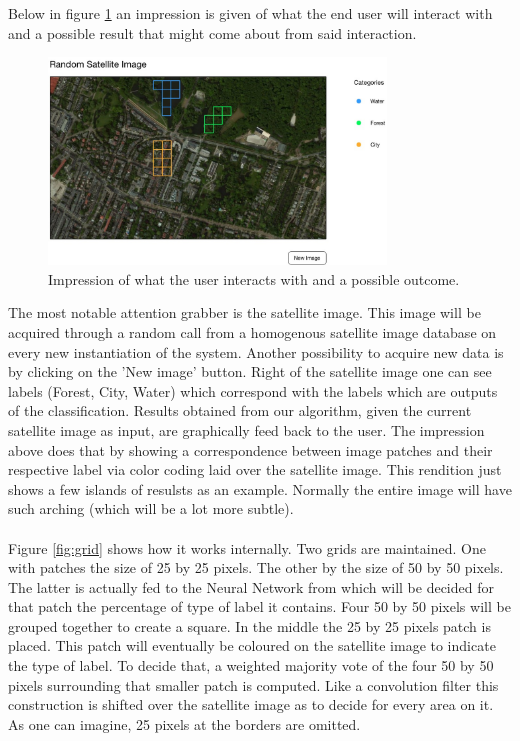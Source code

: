 \documentclass[a4paper,onecolumn]{report}
\begin{document}
Below in figure \ref{fig:impression} an impression is given of what the end user will interact with and a possible result that might come about from said interaction.\\

\begin{figure}[h!]
    \centering
    \includegraphics[width=0.8\textwidth]{./images/impression.jpg}
    \caption{Impression of what the user interacts with and a possible outcome.}
	\label{fig:impression}
\end{figure}
\noindent
The most notable attention grabber is the satellite image. This image will be acquired through a random call from a homogenous satellite image database on every new instantiation of the system. Another possibility to acquire new data is by clicking on the 'New image' button. Right of the satellite image one can see labels (Forest, City, Water) which correspond with the labels which are outputs of the classification. Results obtained from our algorithm, given the current satellite image as input, are graphically feed back to the user. The impression above does that by showing a correspondence between image patches and their respective label via color coding laid over the satellite image. This rendition just shows a few islands of resulsts as an example. Normally the entire image will have such arching (which will be a lot more subtle).\\
\\
Figure \ref{fig:grid} shows how it works internally. Two grids are maintained. One with patches the size of 25 by 25 pixels. The other by the size of 50 by 50 pixels. The latter is actually fed to the Neural Network from which will be decided for that patch the percentage of type of label it contains.  Four 50 by 50 pixels will be grouped together to create a square. In the middle the 25 by 25 pixels patch is placed. This patch will eventually be coloured on the satellite image to indicate the type of label. To decide that, a weighted majority vote of the four 50 by 50 pixels surrounding that smaller patch is computed. Like a convolution filter this construction is shifted over the satellite image as to decide for every area on it. As one can imagine, 25 pixels at the borders are omitted. 
\end{document}
